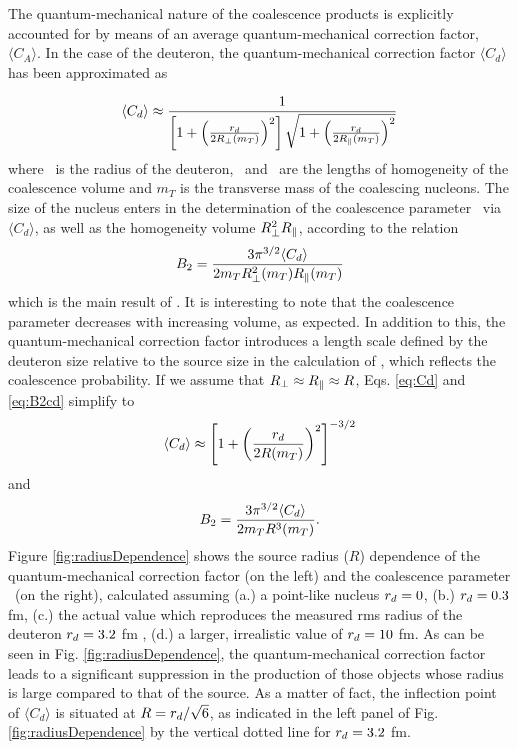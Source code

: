 The quantum-mechanical nature of the coalescence products is explicitly accounted for by means of an average quantum-mechanical correction factor, $\langle C_{A} \rangle$. In the case of the deuteron, the quantum-mechanical correction factor $\langle C_{d} \rangle$ has been approximated as 

\begin{equation}
\langle C_{d} \rangle \approx \frac{1}{\left[1+ \left(\frac{r_{d}}{2R_{\perp}(m_{T})}\right)^{2}\right] \sqrt{1+ \left(\frac{r_{d}}{2R_{\|}(m_{T})}\right)^{2}}}
\label{eq:Cd}
\end{equation}
%
where \dradius~is the radius of the deuteron, \rperp~and \rpar~are the lengths of homogeneity of the coalescence volume and $m_{T}$ is the transverse mass of the coalescing nucleons.
The size of the nucleus enters in the determination of the coalescence parameter \btwo~via $\langle C_{d} \rangle$, as well as the homogeneity volume $R_{\perp}^{2}R_{\|}$, according to the relation
%
\begin{equation}
B_{2} = \frac{3\pi^{3/2} \langle C_{d} \rangle}{2m_{T}R_{\perp}^{2}(m_{T})R_{\|}(m_{T})}
\label{eq:B2cd}
\end{equation}
%
which is the main result of \cite{Scheibl:1998tk}. It is interesting to note that the coalescence parameter decreases with increasing volume, as expected. In addition to this, the quantum-mechanical correction factor introduces a length scale defined by the deuteron size relative to the source size in the calculation of \btwo, which reflects the coalescence probability. 
If we assume that  $R_{\perp} \approx R_{\|} \approx R$, Eqs. \ref{eq:Cd} and \ref{eq:B2cd} simplify to 
\begin{equation}
\langle C_{d} \rangle \approx \left[1+ \left(\frac{r_{d}}{2R(m_{T})}\right)^{2}\right]^{-3/2}
\label{eq:Cdapprox}
\end{equation}
%
and
%
\begin{equation}
B_{2} = \frac{3\pi^{3/2} \langle C_{d} \rangle}{2m_{T}R^{3}(m_{T})}.
\label{eq:B2approx}
\end{equation}
%
Figure \ref{fig:radiusDependence} shows the source radius ($R$) dependence of the quantum-mechanical correction factor (on the left) and the coalescence parameter \btwo~(on the right), calculated assuming (a.) a point-like nucleus $r_{d} = 0$, (b.) $r_{d} = 0.3$ fm, (c.) the actual value which reproduces the measured rms radius of the deuteron $r_{d} = 3.2$ fm \cite{Mohr:2015ccw}, (d.) a larger, irrealistic value of  $r_{d} = 10$ fm. 
As can be seen in Fig. \ref{fig:radiusDependence}, the quantum-mechanical correction factor leads to a significant suppression in the production of those objects whose radius is large compared to that of the source. 
As a matter of fact, the inflection point of $\langle C_{d} \rangle$ is situated at $R = r_{d}/\sqrt{6}$, as indicated in the left panel of Fig. \ref{fig:radiusDependence} by the vertical dotted line for $r_{d} = 3.2$ fm.


